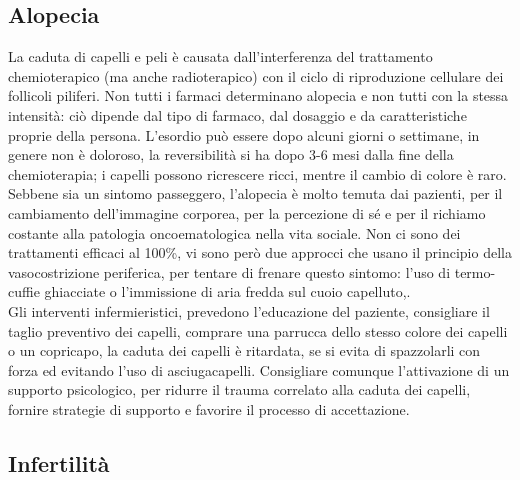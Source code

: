 \subsection{Alopecia}

La caduta di capelli e peli è causata dall’interferenza del trattamento chemioterapico (ma anche radioterapico) con 
il ciclo di riproduzione cellulare dei follicoli piliferi. Non tutti i farmaci determinano alopecia e non tutti con 
la stessa intensità: ciò dipende dal tipo di farmaco, dal dosaggio e da caratteristiche proprie della persona. 
L’esordio può essere dopo alcuni giorni o settimane, in genere non è doloroso, la reversibilità si ha dopo 3-6 mesi 
dalla fine della chemioterapia; i capelli possono ricrescere ricci, mentre il cambio di colore è raro.\\ 
Sebbene sia un sintomo passeggero, l’alopecia è molto temuta dai pazienti, per il cambiamento dell’immagine corporea, 
per la percezione di sé e per il richiamo costante alla patologia oncoematologica nella vita sociale\cite{HAIRLOSS2}. 
Non ci sono dei trattamenti efficaci al 100\%, vi sono però due approcci che usano il 
principio della vasocostrizione periferica, per tentare di frenare questo sintomo:
l’uso di termo-cuffie ghiacciate o l’immissione di aria fredda sul cuoio capelluto\cite{ALOPECIA},\cite{HAIRLOSS}.\\
Gli interventi infermieristici, prevedono l’educazione del paziente, consigliare il taglio preventivo dei capelli, 
comprare una parrucca dello stesso colore dei capelli o un copricapo, la caduta dei capelli è ritardata, se si evita 
di spazzolarli con forza ed evitando l’uso di asciugacapelli. Consigliare comunque l’attivazione di un supporto 
psicologico, per ridurre il trauma correlato alla caduta dei capelli, fornire strategie di supporto e favorire 
il processo di accettazione\cite{ALOPECIA}.

\subsection{Infertilità}

